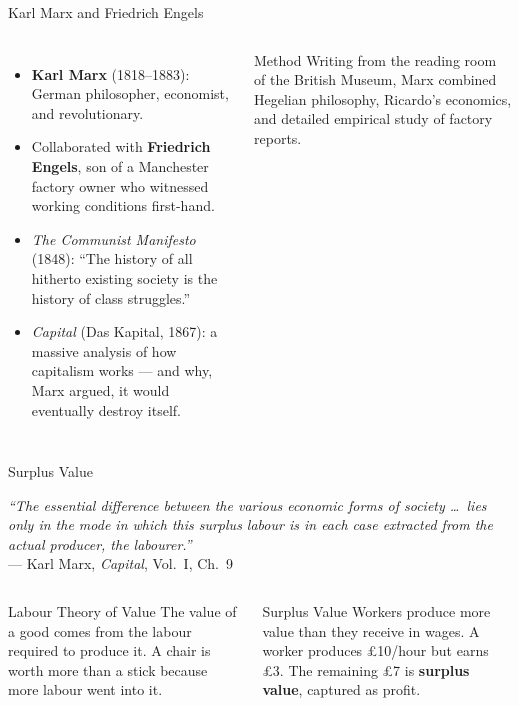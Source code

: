 \documentclass[aspectratio=169, 10pt]{beamer}
\begin{document}
\begin{frame}{Karl Marx and Friedrich Engels}
\begin{columns}[T]
\begin{itemize}
  \item \textbf{Karl Marx} (1818--1883): German philosopher,
        economist, and revolutionary.
  \item Collaborated with \textbf{Friedrich Engels}, son of a
        Manchester factory owner who witnessed working conditions
        first-hand.
  \item \textit{The Communist Manifesto} (1848): ``The history
        of all hitherto existing society is the history of
        class struggles.''
  \item \textit{Capital} (Das Kapital, 1867): a massive analysis
        of how capitalism works --- and why, Marx argued, it
        would eventually \alert{destroy itself}.
\end{itemize}
\begin{block}{Method}
Writing from the reading room of the British Museum, Marx
combined Hegelian philosophy, Ricardo's economics, and
detailed empirical study of factory reports.
\end{block}
\end{columns}
\end{frame}

\begin{frame}{Surplus Value}
\begin{center}
\textit{``The essential difference between the various economic forms
of society \ldots\ lies only in the mode in which this surplus labour
is in each case extracted from the actual producer, the labourer.''}\\[4pt]
--- Karl Marx, \textit{Capital}, Vol.~I, Ch.~9
\end{center}
\vspace{0.8em}
\begin{columns}[T]
\begin{block}{Labour Theory of Value}
The value of a good comes from the labour required to produce it.
A chair is worth more than a stick because more labour went into it.
\end{block}
\begin{block}{Surplus Value}
Workers produce more value than they receive in wages. A worker
produces \pounds 10/hour but earns \pounds 3. The remaining
\alert{\pounds 7} is \textbf{surplus value}, captured as profit.
\end{block}
\end{columns}
\end{frame}
\end{document}

